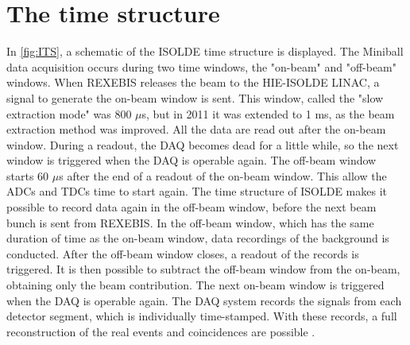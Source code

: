 \documentclass[twoside,english]{uiofysmaster/uiofysmaster}
\let\orgautoref\autoref
\renewcommand{\autoref}
        {%
		 \def\sectionautorefname{Section}%
		 \def\subsectionautorefname{Section}%
		 \def\subsubsectionautorefname{Section}%
		 \def\chapterautorefname{Chapter}%
          \orgautoref}
\begin{document}
\section{The time structure}\label{sec:time_structure}
In \autoref{fig:ITS}, a schematic of the ISOLDE time structure is displayed. 
The Miniball data acquisition occurs during two time windows, the "on-beam" and "off-beam" windows. 
When REXEBIS releases the beam to the HIE-ISOLDE LINAC, a signal to generate the on-beam window is sent. 
This window, called the "slow extraction mode" was 800 $\mu$s, but in 2011 it was extended to 1 ms, as the beam extraction method was improved. 
All the data are read out after the on-beam window. 
During a readout, the DAQ becomes dead for a little while, so the next window is triggered when the DAQ is operable again.
The off-beam window starts 60 $\mu$s after the end of a readout of the on-beam window.
This allow the ADCs and TDCs time to start again.
The time structure of ISOLDE makes it possible to record data again in the off-beam window, before the next beam bunch is sent from REXEBIS.
In the off-beam window, which has the same duration of time as the on-beam window, data recordings of the background is conducted.
After the off-beam window closes, a readout of the records is triggered.
It is then possible to subtract the off-beam window from the on-beam, obtaining only the beam contribution. 
The next on-beam window is triggered when the DAQ is operable again.
The DAQ system records the signals from each detector segment, which is individually time-stamped. 
With these records, a full reconstruction of the real events and coincidences are possible \cite{NWarr-el}. 
\end{document}
